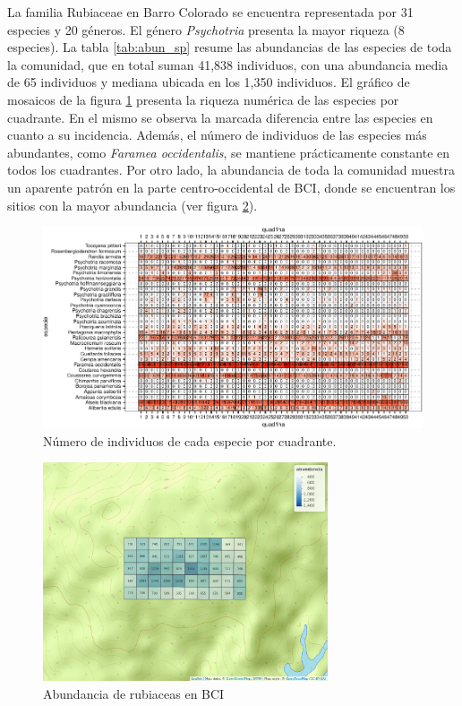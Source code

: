 \documentclass[11pt,]{article}
\begin{document}
La familia Rubiaceae en Barro Colorado se encuentra representada por 31
especies y 20 géneros. El género \emph{Psychotria} presenta la mayor
riqueza (8 especies). La tabla \ref{tab:abun_sp} resume las abundancias
de las especies de toda la comunidad, que en total suman 41,838
individuos, con una abundancia media de 65 individuos y mediana ubicada
en los 1,350 individuos. El gráfico de mosaicos de la figura
\ref{fig:abun_sp_q} presenta la riqueza numérica de las especies por
cuadrante. En el mismo se observa la marcada diferencia entre las
especies en cuanto a su incidencia. Además, el número de individuos de
las especies más abundantes, como \emph{Faramea occidentalis}, se
mantiene prácticamente constante en todos los cuadrantes. Por otro lado,
la abundancia de toda la comunidad muestra un aparente patrón en la
parte centro-occidental de BCI, donde se encuentran los sitios con la
mayor abundancia (ver figura \ref{fig:mapa_cuadros_abun_rubic}).

\begin{figure}
\centering
\includegraphics{manuscrito_files/figure-latex/unnamed-chunk-2-1.pdf}
\caption{\label{fig:abun_sp_q}Número de individuos de cada especie por
cuadrante.}
\end{figure}

\begin{figure}
\centering
\includegraphics[width=0.75000\textwidth]{mapa_cuadros_abun_rubic.png}
\caption{Abundancia de rubiaceas en BCI
\label{fig:mapa_cuadros_abun_rubic}}
\end{figure}
\end{document}

